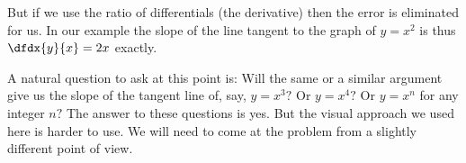 But if we use the ratio of differentials (the derivative) then the
error is eliminated for us. In our example the slope of the line
tangent to the graph of $y=x^2$ is thus $\dfdx{y}{x}=2x$ exactly.

A natural question to ask at this point is: Will the same or a similar
argument give us the slope of the tangent line of, say, $y=x^3?$ Or
$y=x^4?$ Or $y=x^n$ for any integer $n?$ The answer to these questions
is yes. But the visual approach we used here is harder to use. We will
need to come at the problem from a slightly different point of view.









